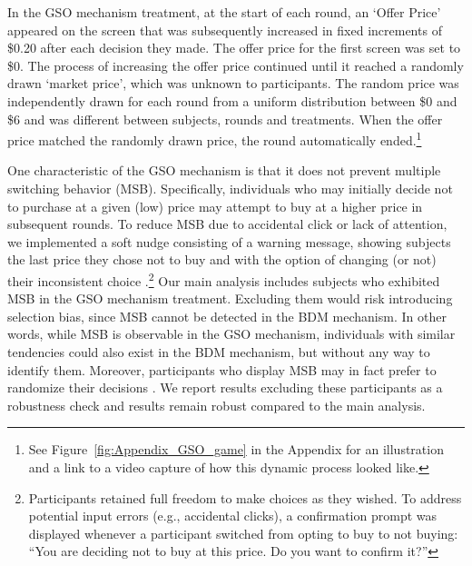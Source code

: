 \documentclass[12pt]{article}
\begin{document}
In the GSO mechanism treatment, at the start of each round, an `Offer Price' appeared on the screen that was subsequently increased in fixed increments of \$0.20 after each decision they made. %
The offer price for the first screen was set to \$0. The process of increasing the offer price continued until it reached a randomly drawn `market price', which was unknown to participants. The random price was independently drawn for each round from a uniform distribution between \$0 and \$6 and was different between subjects, rounds and treatments. When the offer price matched the randomly drawn price, the round automatically ended.\footnote{See Figure~\ref{fig:Appendix_GSO_game} in the Appendix for an illustration and a link to a video capture of how this dynamic process looked like.} 



One characteristic of the GSO mechanism is that it does not prevent multiple switching behavior (MSB). Specifically, individuals who may initially decide not to purchase at a given (low) price may attempt to buy at a higher price in subsequent rounds. To reduce MSB due to accidental click or lack of attention, we implemented a soft nudge consisting of a warning message, showing subjects the last price they chose not to buy and with the option of changing (or not) their inconsistent choice \citep{yu2021multiple}.\footnote{Participants retained full freedom to make choices as they wished. To address potential input errors (e.g., accidental clicks), a confirmation prompt was displayed whenever a participant switched from opting to buy to not buying: ``You are deciding not to buy at this price. Do you want to confirm it?''} 
Our main analysis includes subjects who exhibited MSB in the GSO mechanism treatment. Excluding them would risk introducing selection bias, since MSB cannot be detected in the BDM mechanism. In other words, while MSB is observable in the GSO mechanism, individuals with similar tendencies could also exist in the BDM mechanism, but without any way to identify them. 
Moreover,  participants who display MSB may in fact prefer to randomize their decisions \citep{agranov2017stochastic}. We report results excluding these participants as a robustness check and results remain robust compared to the main analysis.
    
\end{document}
